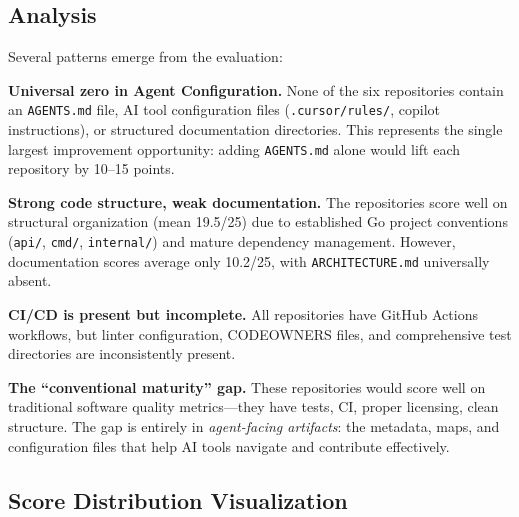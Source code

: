 \documentclass[11pt,twocolumn]{article}
\begin{document}
\subsection{Analysis}

Several patterns emerge from the evaluation:

\textbf{Universal zero in Agent Configuration.} None of the six
repositories contain an \texttt{AGENTS.md} file, AI tool configuration
files (\texttt{.cursor/rules/}, copilot instructions), or structured
documentation directories. This represents the single largest
improvement opportunity: adding \texttt{AGENTS.md} alone would lift
each repository by 10--15 points.

\textbf{Strong code structure, weak documentation.} The repositories
score well on structural organization (mean 19.5/25) due to established
Go project conventions (\texttt{api/}, \texttt{cmd/}, \texttt{internal/})
and mature dependency management. However, documentation scores average
only 10.2/25, with \texttt{ARCHITECTURE.md} universally absent.

\textbf{CI/CD is present but incomplete.} All repositories have GitHub
Actions workflows, but linter configuration, CODEOWNERS files, and
comprehensive test directories are inconsistently present.

\textbf{The ``conventional maturity'' gap.} These repositories would
score well on traditional software quality metrics---they have tests,
CI, proper licensing, clean structure. The gap is entirely in
\emph{agent-facing artifacts}: the metadata, maps, and configuration
files that help AI tools navigate and contribute effectively.

\subsection{Score Distribution Visualization}
\end{document}
